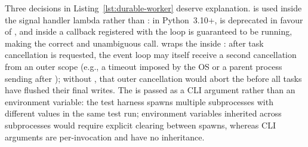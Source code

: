 Three decisions in Listing~\ref{lst:durable-worker} deserve explanation.
 is used inside the signal
handler lambda rather than : in Python~3.10+,
 is deprecated in favour of
, and inside a callback registered with
 the loop is guaranteed to be running, making
 the correct and unambiguous call. 
wraps the  inside : after task
cancellation is requested, the event loop may itself receive a second
cancellation from an outer scope (e.g., a timeout imposed by the OS or a
parent process sending  after ); without
, that outer cancellation would abort the 
before all tasks have flushed their final writes. The 
is passed as a CLI argument rather than an environment variable: the test
harness spawns multiple subprocesses with different  values
in the same test run; environment variables inherited across subprocesses
would require explicit clearing between spawns, whereas CLI arguments
are per-invocation and have no inheritance.


